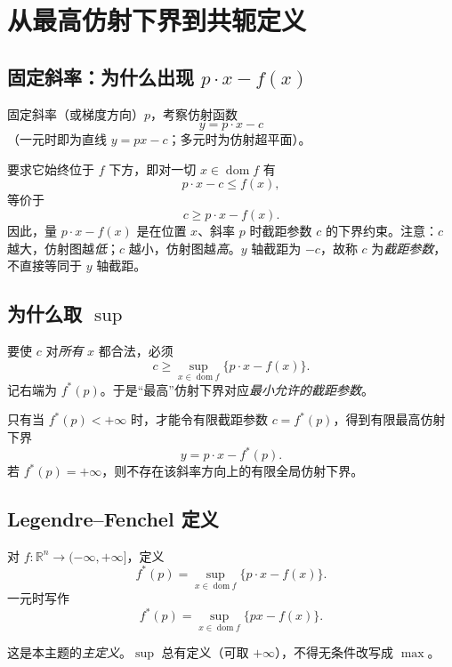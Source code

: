 \documentclass[
    lang=cn,
    color=blue,
    mode=fancy,
    thmcnt=section,
    scheme=chinese,
    chinesefont=ctexfont
]{elegantbook}
\newcommand{\R}{\mathbb{R}}
\DeclareMathOperator{\dom}{dom}
\newcommand{\fstarp}{f^{\ast}(p)}
\begin{document}
\chapter{从最高仿射下界到共轭定义}

\section{\texorpdfstring{固定斜率：为什么出现 $p\cdot x-f(x)$}{固定斜率：为什么出现 p·x-f(x)}}

固定斜率（或梯度方向）$p$，考察仿射函数
\[
y=p\cdot x-c
\]
（一元时即为直线 $y=px-c$；多元时为仿射超平面）。

要求它始终位于 $f$ 下方，即对一切 $x\in\dom f$ 有
\[
p\cdot x-c\le f(x),
\]
等价于
\[
c\ge p\cdot x-f(x).
\]
因此，量 $p\cdot x-f(x)$ 是在位置 $x$、斜率 $p$ 时截距参数 $c$ 的下界约束。注意：$c$ 越大，仿射图越\emph{低}；$c$ 越小，仿射图越\emph{高}。$y$ 轴截距为 $-c$，故称 $c$ 为\emph{截距参数}，不直接等同于 $y$ 轴截距。


\section{\texorpdfstring{为什么取 $\sup$}{为什么取 sup}}

要使 $c$ 对\emph{所有} $x$ 都合法，必须
\[
c\ge\sup_{x\in\dom f}\bigl\{p\cdot x-f(x)\bigr\}.
\]
记右端为 $\fstarp$。于是``最高''仿射下界对应\emph{最小允许的截距参数}。

\begin{proposition}[有限性]
只有当 $\fstarp<+\infty$ 时，才能令有限截距参数 $c=\fstarp$，得到有限最高仿射下界
\[
y=p\cdot x-\fstarp.
\]
若 $\fstarp=+\infty$，则不存在该斜率方向上的有限全局仿射下界。
\end{proposition}


\section{Legendre--Fenchel 定义}

\begin{definition}
对 $f:\R^{n}\to(-\infty,+\infty]$，定义
\[
\fstarp=\sup_{x\in\dom f}\bigl\{p\cdot x-f(x)\bigr\}.
\]
一元时写作
\[
\fstarp=\sup_{x\in\dom f}\bigl\{px-f(x)\bigr\}.
\]
\end{definition}

这是本主题的\emph{主定义}。$\sup$ 总有定义（可取 $+\infty$），不得无条件改写成 $\max$。
\end{document}
